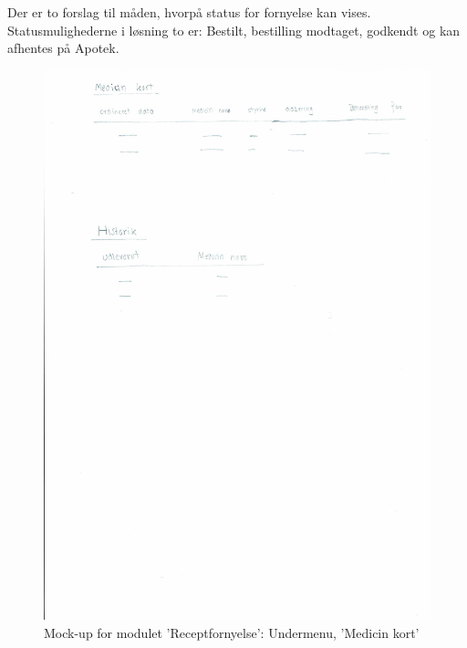 Der er to forslag til måden, hvorpå status for fornyelse kan vises. Statusmulighederne i løsning to er: Bestilt, bestilling modtaget, godkendt og kan afhentes på Apotek.\\
\begin{figure}[H]
	\centering
	\includegraphics[angle=0, width=\linewidth]{Materials/FornyRecept_Medicinkort.pdf}
	\caption{Mock-up for modulet 'Receptfornyelse': Undermenu, 'Medicin kort'}
	\label{fig:Mock-Up3}
\end{figure}
